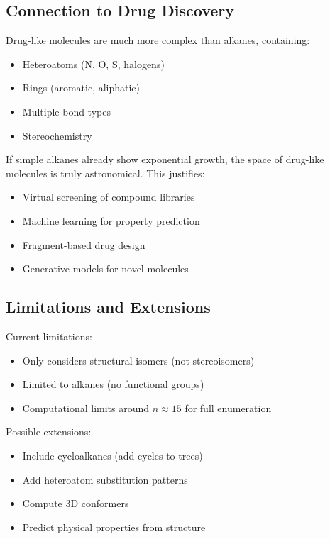 \documentclass[conference]{IEEEtran}
\begin{document}
\subsection{Connection to Drug Discovery}

Drug-like molecules are much more complex than alkanes, containing:
\begin{itemize}
    \item Heteroatoms (N, O, S, halogens)
    \item Rings (aromatic, aliphatic)
    \item Multiple bond types
    \item Stereochemistry
\end{itemize}

If simple alkanes already show exponential growth, the space of drug-like molecules is truly astronomical. This justifies:
\begin{itemize}
    \item Virtual screening of compound libraries
    \item Machine learning for property prediction
    \item Fragment-based drug design
    \item Generative models for novel molecules
\end{itemize}

\subsection{Limitations and Extensions}

Current limitations:
\begin{itemize}
    \item Only considers structural isomers (not stereoisomers)
    \item Limited to alkanes (no functional groups)
    \item Computational limits around $n \approx 15$ for full enumeration
\end{itemize}

Possible extensions:
\begin{itemize}
    \item Include cycloalkanes (add cycles to trees)
    \item Add heteroatom substitution patterns
    \item Compute 3D conformers
    \item Predict physical properties from structure
\end{itemize}
\end{document}

